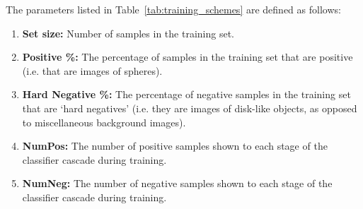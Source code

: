 \documentclass{sig-alternate-05-2015}
\newcommand{\scarequotes}[1]{`#1'}
\newcommand{\newterm}[1]{{\textit{#1}}}
\newcommand{\citep}[1]{\cite{#1}}
\begin{document}
{		%
		The parameters listed in Table~\ref{tab:training_schemes} are defined as follows:

		\begin{enumerate}
			\item{\textbf{Set size:}} Number of samples in the training set.
			\item{\textbf{Positive \%:}} The percentage of samples in the training set that are positive (i.e. that are images of spheres).
			\item{\textbf{Hard Negative \%:}} The percentage of negative samples in the training set that are \scarequotes{hard negatives} (i.e. they are images of disk-like objects, as opposed to miscellaneous background images).
			\item{\textbf{NumPos:}} The number of positive samples shown to each stage of the classifier cascade during training.
			\item{\textbf{NumNeg:}} The number of negative samples shown to each stage of the classifier cascade during training.
		\end{enumerate}

}
\end{document}
